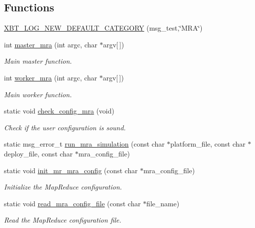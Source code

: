 \subsection*{\-Functions}
\begin{DoxyCompactItemize}
\item 
\hyperlink{simcore-mra_8c_ad2e657250a9756c87c6da2ea76f38875}{\-X\-B\-T\-\_\-\-L\-O\-G\-\_\-\-N\-E\-W\-\_\-\-D\-E\-F\-A\-U\-L\-T\-\_\-\-C\-A\-T\-E\-G\-O\-R\-Y} (msg\-\_\-test,\char`\"{}\-M\-R\-A\char`\"{})
\item 
int \hyperlink{simcore-mra_8c_afc38789b94eade9a7b1c6ae97a784af1}{master\-\_\-mra} (int argc, char $\ast$argv\mbox{[}$\,$\mbox{]})
\begin{DoxyCompactList}\small\item\em \-Main master function. \end{DoxyCompactList}\item 
int \hyperlink{simcore-mra_8c_a3f18ef8503f272839fc15596ace82344}{worker\-\_\-mra} (int argc, char $\ast$argv\mbox{[}$\,$\mbox{]})
\begin{DoxyCompactList}\small\item\em \-Main worker function. \end{DoxyCompactList}\item 
static void \hyperlink{simcore-mra_8c_a926867fcb6aaa2dcdd4f4a7ea5607a59}{check\-\_\-config\-\_\-mra} (void)
\begin{DoxyCompactList}\small\item\em \-Check if the user configuration is sound. \end{DoxyCompactList}\item 
static msg\-\_\-error\-\_\-t \hyperlink{simcore-mra_8c_a35d3431ac28f0898e832ac8683358a02}{run\-\_\-mra\-\_\-simulation} (const char $\ast$platform\-\_\-file, const char $\ast$deploy\-\_\-file, const char $\ast$mra\-\_\-config\-\_\-file)
\item 
static void \hyperlink{simcore-mra_8c_a266ca80d5d7ee9e58dab08f8d7044bf6}{init\-\_\-mr\-\_\-mra\-\_\-config} (const char $\ast$mra\-\_\-config\-\_\-file)
\begin{DoxyCompactList}\small\item\em \-Initialize the \-Map\-Reduce configuration. \end{DoxyCompactList}\item 
static void \hyperlink{simcore-mra_8c_a88af1c2716456427567c196ae8d35387}{read\-\_\-mra\-\_\-config\-\_\-file} (const char $\ast$file\-\_\-name)
\begin{DoxyCompactList}\small\item\em \-Read the \-Map\-Reduce configuration file. \end{DoxyCompactList}\item 

\end{DoxyCompactItemize}

